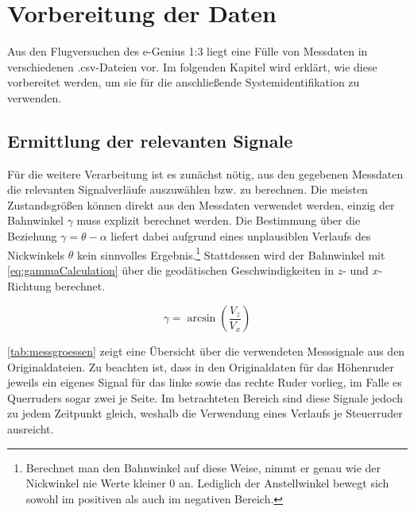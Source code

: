 \chapter{Vorbereitung der Daten}\label{chapter:vorbereitung}
Aus den Flugversuchen des e-Genius 1:3 liegt eine Fülle von Messdaten in verschiedenen .csv-Dateien vor. Im folgenden Kapitel 
wird erklärt, wie diese vorbereitet werden, um sie für die anschließende Systemidentifikation zu verwenden.



\section{Ermittlung der relevanten Signale} %
Für die weitere Verarbeitung ist es zunächst nötig, aus den gegebenen Messdaten die relevanten Signalverläufe auszuwählen 
bzw. zu berechnen. Die meisten Zustandsgrößen können direkt aus den Messdaten verwendet werden, einzig der Bahnwinkel $ 
\gamma $ muss explizit berechnet werden. Die Bestimmung über die Beziehung $ \gamma=\theta-\alpha $ liefert dabei aufgrund 
eines unplausiblen Verlaufs des Nickwinkels $ \theta $ kein sinnvolles Ergebnis.\footnote{Berechnet man den Bahnwinkel auf 
diese Weise, nimmt er genau wie der Nickwinkel nie Werte kleiner 0 an. Lediglich der Anstellwinkel bewegt sich sowohl im 
positiven als auch im negativen Bereich.} Stattdessen wird der Bahnwinkel mit \cref{eq:gammaCalculation} über die 
geodätischen Geschwindigkeiten in $ z $- und $ x $-Richtung berechnet.

\begin{equation}
	\gamma = \arcsin{\left( \frac{V_z}{V_x} \right)}
	\label{eq:gammaCalculation}
\end{equation}

\cref{tab:messgroessen} zeigt eine Übersicht über die verwendeten Messsignale aus den Originaldateien. Zu beachten ist, dass 
in den Originaldaten für das Höhenruder jeweils ein eigenes Signal für das linke sowie das rechte 
Ruder vorlieg, im Falle es Querruders sogar zwei je Seite. Im betrachteten Bereich sind diese Signale jedoch zu jedem 
Zeitpunkt  gleich, weshalb die Verwendung eines Verlaufs je Steuerruder ausreicht.

